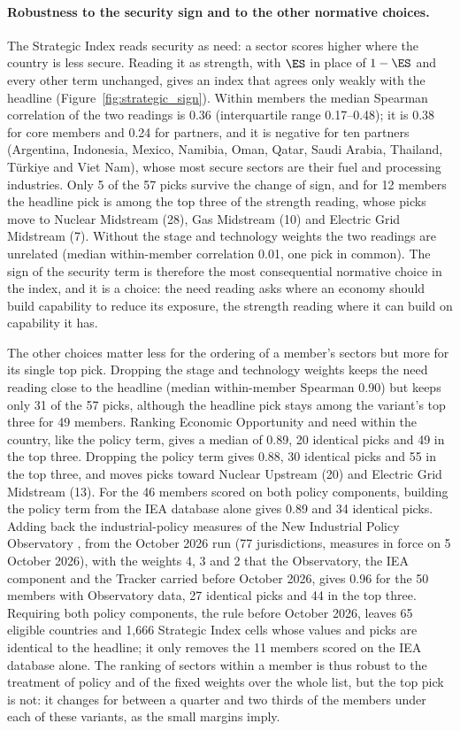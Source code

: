 \paragraph{Robustness to the security sign and to the other normative choices.} The Strategic
Index reads security as need: a sector scores higher where the country is less secure. Reading it
as strength, with $\ES$ in place of $1-\ES$ and every other term unchanged, gives an index that
agrees only weakly with the headline (Figure~\ref{fig:strategic_sign}). Within members the median
Spearman correlation of the two readings is 0.36 (interquartile range 0.17--0.48); it is 0.38 for
core members and 0.24 for partners, and it is negative for ten partners (Argentina, Indonesia,
Mexico, Namibia, Oman, Qatar, Saudi Arabia, Thailand, T\"urkiye and Viet Nam), whose most secure
sectors are their fuel and processing industries. Only 5 of the 57 picks survive the change of
sign, and for 12 members the headline pick is among the top three of the strength reading, whose
picks move to Nuclear Midstream (28), Gas Midstream (10) and Electric Grid Midstream (7). Without
the stage and technology weights the two readings are unrelated (median within-member correlation
0.01, one pick in common). The sign of the security term is therefore the most consequential
normative choice in the index, and it is a choice: the need reading asks where an economy should
build capability to reduce its exposure, the strength reading where it can build on capability it
has.

The other choices matter less for the ordering of a member's sectors but more for its single top
pick. Dropping the stage and technology weights keeps the need reading close to the headline
(median within-member Spearman 0.90) but keeps only 31 of the 57 picks, although the headline pick
stays among the variant's top three for 49 members. Ranking Economic Opportunity and need within
the country, like the policy term, gives a median of 0.89, 20 identical picks and 49 in the top
three. Dropping the policy term gives 0.88, 30 identical picks and 55 in the top three, and moves
picks toward Nuclear Upstream (20) and Electric Grid Midstream (13). For the 46 members scored on
both policy components, building the policy term from the IEA database alone gives 0.89 and 34
identical picks. Adding back the industrial-policy measures of the New Industrial Policy
Observatory \citep{gta2026nipo}, from the October 2026 run (77 jurisdictions, measures in force on
5 October 2026), with the weights 4, 3 and 2 that the Observatory, the IEA component and the
Tracker carried before October 2026, gives 0.96 for the 50 members with Observatory data, 27
identical picks and 44 in the top three. Requiring both policy components, the rule before October
2026, leaves 65 eligible countries and 1,666 Strategic Index cells whose values and picks are
identical to the headline; it only removes the 11 members scored on the IEA database alone. The
ranking of sectors within a member is thus robust to the treatment of policy and of the fixed
weights over the whole list, but the top pick is not: it changes for between a quarter and two
thirds of the members under each of these variants, as the small margins imply.

